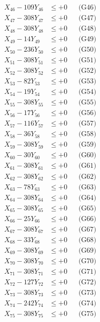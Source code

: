 \documentclass[a4paper,10pt]{article}
\begin{document}
{\begin{align}
X_{46} - 109Y_{46} &\leq +0 && \text{(G46)} \\
X_{47} - 308Y_{47} &\leq +0 && \text{(G47)} \\
X_{48} - 308Y_{48} &\leq +0 && \text{(G48)} \\
X_{49} - 14Y_{49} &\leq +0 && \text{(G49)} \\
X_{50} - 236Y_{50} &\leq +0 && \text{(G50)} \\
\allowbreak
X_{51} - 308Y_{51} &\leq +0 && \text{(G51)} \\
X_{52} - 308Y_{52} &\leq +0 && \text{(G52)} \\
X_{53} - 82Y_{53} &\leq +0 && \text{(G53)} \\
X_{54} - 19Y_{54} &\leq +0 && \text{(G54)} \\
X_{55} - 308Y_{55} &\leq +0 && \text{(G55)} \\
X_{56} - 17Y_{56} &\leq +0 && \text{(G56)} \\
X_{57} - 116Y_{57} &\leq +0 && \text{(G57)} \\
X_{58} - 36Y_{58} &\leq +0 && \text{(G58)} \\
X_{59} - 308Y_{59} &\leq +0 && \text{(G59)} \\
X_{60} - 30Y_{60} &\leq +0 && \text{(G60)} \\
\allowbreak
X_{61} - 308Y_{61} &\leq +0 && \text{(G61)} \\
X_{62} - 308Y_{62} &\leq +0 && \text{(G62)} \\
X_{63} - 78Y_{63} &\leq +0 && \text{(G63)} \\
X_{64} - 308Y_{64} &\leq +0 && \text{(G64)} \\
X_{65} - 308Y_{65} &\leq +0 && \text{(G65)} \\
X_{66} - 25Y_{66} &\leq +0 && \text{(G66)} \\
X_{67} - 308Y_{67} &\leq +0 && \text{(G67)} \\
X_{68} - 33Y_{68} &\leq +0 && \text{(G68)} \\
X_{69} - 308Y_{69} &\leq +0 && \text{(G69)} \\
X_{70} - 308Y_{70} &\leq +0 && \text{(G70)} \\
\allowbreak
X_{71} - 308Y_{71} &\leq +0 && \text{(G71)} \\
X_{72} - 127Y_{72} &\leq +0 && \text{(G72)} \\
X_{73} - 308Y_{73} &\leq +0 && \text{(G73)} \\
X_{74} - 242Y_{74} &\leq +0 && \text{(G74)} \\
X_{75} - 308Y_{75} &\leq +0 && \text{(G75)} \\

\end{align}}
\end{document}
